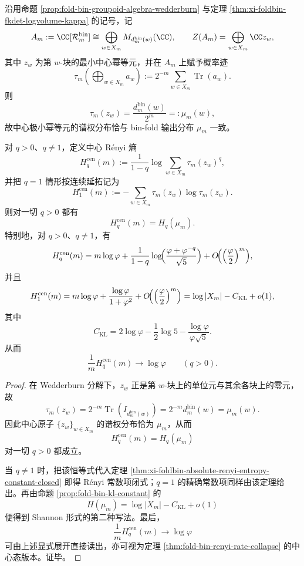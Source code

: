 \begin{theorem}\label{thm:xi-foldbin-groupoid-central-renyi-shannon-identity}
沿用命题 \ref{prop:fold-bin-groupoid-algebra-wedderburn} 与定理 \ref{thm:xi-foldbin-fkdet-logvolume-kappa} 的记号，记
\[
A_m:=\CC[\mathcal R_m^{\mathrm{bin}}]
\cong
\bigoplus_{w\in X_m}M_{d_m^{\mathrm{bin}}(w)}(\CC),
\qquad
Z(A_m)=\bigoplus_{w\in X_m}\CC z_w,
\]
其中 \(z_w\) 为第 \(w\)-块的最小中心幂等元，并在 \(A_m\) 上赋予概率迹
\[
\tau_m\!\left(\bigoplus_{w\in X_m}a_w\right):=
2^{-m}\sum_{w\in X_m}\operatorname{Tr}(a_w).
\]
则
\[
\tau_m(z_w)=\frac{d_m^{\mathrm{bin}}(w)}{2^m}=:\mu_m(w),
\]
故中心极小幂等元的谱权分布恰与 bin-fold 输出分布 \(\mu_m\) 一致。

对 \(q>0\)、\(q\neq 1\)，定义中心 Rényi 熵
\[
H_q^{\mathrm{cen}}(m):=
\frac{1}{1-q}\log\sum_{w\in X_m}\tau_m(z_w)^q,
\]
并把 \(q=1\) 情形按连续延拓记为
\[
H_1^{\mathrm{cen}}(m):=
-\sum_{w\in X_m}\tau_m(z_w)\log\tau_m(z_w).
\]
则对一切 \(q>0\) 都有
\[
H_q^{\mathrm{cen}}(m)=H_q(\mu_m).
\]
特别地，对 \(q>0\)、\(q\neq 1\)，有
\[
H_q^{\mathrm{cen}}(m)
=
m\log\varphi
+\frac{1}{1-q}\log\!\Bigl(\frac{\varphi+\varphi^{-q}}{\sqrt5}\Bigr)
+O\!\Bigl(\Bigl(\frac{\varphi}{2}\Bigr)^m\Bigr),
\]
并且
\[
H_1^{\mathrm{cen}}(m)
=
m\log\varphi
+\frac{\log\varphi}{1+\varphi^2}
+O\!\Bigl(\Bigl(\frac{\varphi}{2}\Bigr)^m\Bigr)
=
\log|X_m|-C_{\mathrm{KL}}+o(1),
\]
其中
\[
C_{\mathrm{KL}}
=
2\log\varphi-\frac12\log 5-\frac{\log\varphi}{\varphi\sqrt5}.
\]
从而
\[
\frac{1}{m}H_q^{\mathrm{cen}}(m)\longrightarrow \log\varphi
\qquad (q>0).
\]
\end{theorem}
\begin{proof}
在 Wedderburn 分解下，\(z_w\) 正是第 \(w\)-块上的单位元与其余各块上的零元，故
\[
\tau_m(z_w)
=
2^{-m}\operatorname{Tr}(I_{d_m^{\mathrm{bin}}(w)})
=
2^{-m}d_m^{\mathrm{bin}}(w)
=
\mu_m(w).
\]
因此中心原子 \(\{z_w\}_{w\in X_m}\) 的谱权分布恰为 \(\mu_m\)，从而
\[
H_q^{\mathrm{cen}}(m)=H_q(\mu_m)
\]
对一切 \(q>0\) 都成立。

当 \(q\neq 1\) 时，把该恒等式代入定理 \ref{thm:xi-foldbin-absolute-renyi-entropy-constant-closed} 即得 Rényi 常数项闭式；\(q=1\) 的精确常数项同样由该定理给出。再由命题 \ref{prop:fold-bin-kl-constant} 的
\[
H(\mu_m)=\log|X_m|-C_{\mathrm{KL}}+o(1)
\]
便得到 Shannon 形式的第二种写法。最后，
\[
\frac1m H_q^{\mathrm{cen}}(m)\to \log\varphi
\]
可由上述显式展开直接读出，亦可视为定理 \ref{thm:fold-bin-renyi-rate-collapse} 的中心态版本。证毕。
\end{proof}


